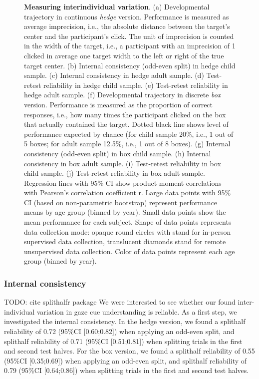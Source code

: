 \documentclass[
  man,floatsintext]{apa6}
\begin{document}
\begin{figure}
\caption{\textbf{Measuring interindividual variation}.
(a) Developmental trajectory in continuous \emph{hedge} version. Performance is measured as average imprecision, i.e., the absolute distance between the target's center and the participant's click. The unit of imprecision is counted in the width of the target, i.e., a participant with an imprecision of 1 clicked in average one target width to the left or right of the true target center.
(b) Internal consistency (odd-even split) in hedge child sample. (c) Internal consistency in hedge adult sample. (d) Test-retest reliability in hedge child sample. (e) Test-retest reliability in hedge adult sample.
(f) Developmental trajectory in discrete \emph{box} version. Performance is measured as the proportion of correct responses, i.e., how many times the participant clicked on the box that actually contained the target. Dotted black line shows level of performance expected by chance (for child sample 20\%, i.e., 1 out of 5 boxes; for adult sample 12.5\%, i.e., 1 out of 8 boxes).
(g) Internal consistency (odd-even split) in box child sample. (h) Internal consistency in box adult sample. (i) Test-retest reliability in box child sample. (j) Test-retest reliability in box adult sample.
Regression lines with 95\% CI show product-moment-correlations with Pearson's correlation coefficient r.
Large data points with 95\% CI (based on non-parametric bootstrap) represent performance means by age group (binned by year).
Small data points show the mean performance for each subject. Shape of data points represents data collection mode: opaque round circles with stand for in-person supervised data collection, translucent diamonds stand for remote unsupervised data collection. Color of data points represent each age group (binned by year).}\label{fig:fig2}
\end{figure}

\hypertarget{internal-consistency}{%
\subsubsection{Internal consistency}\label{internal-consistency}}

TODO: cite splithalfr package
We were interested to see whether our found inter-individual variation in gaze cue understanding is reliable. As a first step, we investigated the internal consistency. In the hedge version, we found a splithalf reliability of
0.72 (95\%CI {[}0.60;0.82{]}) when applying an odd-even split, and splithalf reliability of
0.71 (95\%CI {[}0.51;0.81{]}) when splitting trials in the first and second test halves.
For the box version, we found a splithalf reliability of
0.55 (95\%CI {[}0.35;0.69{]}) when applying an odd-even split, and splithalf reliability of
0.79 (95\%CI {[}0.64;0.86{]}) when splitting trials in the first and second test halves.
\end{document}
